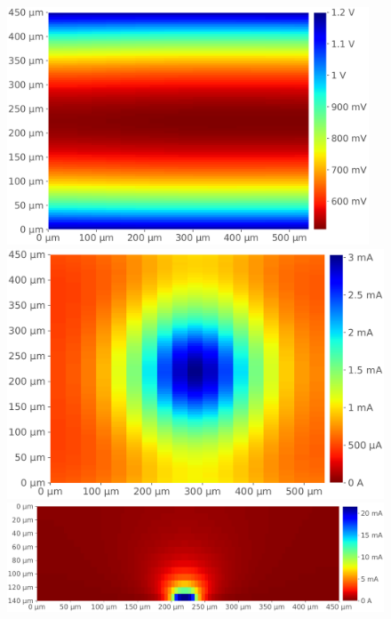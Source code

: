 \begin{figure}[hbtp]
	\begin{minipage}{0.3\textwidth}
		\centering
		\includegraphics[width=0.96\textwidth]{./figures/modelesSimusResul/dualWell/positive/pdn_dw_positif300.pdf}
		\includegraphics[width=\textwidth]{./figures/modelesSimusResul/dualWell/positive/iepi_dw_positif300.pdf}
		\includegraphics[width=\textwidth]{./figures/modelesSimusResul/dualWell/positive/isub_dw_positif300.pdf}

\end{minipage}
\end{figure}
